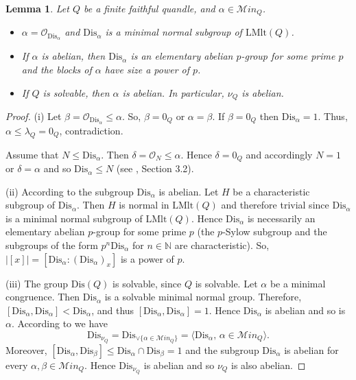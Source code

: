 \documentclass[a4paper, english, 9pt]{amsart}
\theoremstyle{plain}
\newtheorem{lemma}[theorem]{Lemma}
\theoremstyle{definition}
\def\lmlt{\mathrm{LMlt}}
\def\dis{\mathrm{Dis}}
\def\comment#1{{\color{red} #1}}
\def\ma{\mathcal Min}
\begin{document}
\begin{lemma}\label{minimal cong}
Let $Q$ be a finite faithful quandle, and $\alpha\in \ma_Q$. 
\begin{itemize}
    \item[(i)] $\alpha=\mathcal{O}_{\dis_\alpha}$ and $\dis_\alpha$ is a minimal normal subgroup of $\lmlt(Q)$.
    \item[(ii)] If $\alpha$ is abelian, then $\dis_\alpha$ is an elementary abelian $p$-group for some prime $p$ and the blocks of $\alpha$ have size a power of $p$.
\item[(iii)]  If $Q$ is solvable, then $\alpha$ is abelian. In particular, $\nu_Q$ is abelian.
\end{itemize}

\end{lemma}
\begin{proof}

(i) Let $\beta=\mathcal{O}_{\dis_\alpha}\leq \alpha$. So, $\beta=0_Q$ or $\alpha=\beta$. If $\beta=0_Q$ then $\dis_\alpha=1$. Thus, $\alpha\leq \lambda_Q=0_Q$, contradiction.

Assume that $N\leq \dis_\alpha$. Then $\delta=\mathcal{O}_N\leq \alpha$. Hence $\delta=0_Q$ and accordingly $N=1$ or $\delta=\alpha$ and so $\dis_\alpha\leq N$ (see \cite{CP}, Section 3.2). 

(ii) According to \cite[Corollary 5.4]{CP} the subgroup $\dis_\alpha$ is abelian. Let $H$ be a characteristic subgroup of $\dis_\alpha$. Then $H$ is normal in $\lmlt(Q)$ and therefore trivial since $\dis_\alpha$ is a minimal normal subgroup of $\lmlt(Q)$. Hence $\dis_\alpha$ is necessarily an elementary abelian $p$-group for some prime $p$ (the $p$-Sylow subgroup and the subgroups of the form $p^n\dis_\alpha$ for $n\in \mathbb{N}$ are characteristic). So, $|[x]|=[\dis_\alpha:(\dis_\alpha)_x]$ is a power of $p$.

(iii) The group $\dis(Q)$ is solvable, since $Q$ is solvable. Let $\alpha$ be a minimal congruence. Then $\dis_\alpha$ is a solvable minimal normal group. Therefore, $[\dis_\alpha,\dis_\alpha]<\dis_\alpha$, and thus $[\dis_\alpha,\dis_\alpha]=1$. Hence $\dis_\alpha$ is abelian and so is $\alpha$. According to \cite[Proposition 3.2(2)]{CP} we have 
$$\dis_{\nu_Q}=\dis_{\vee \{\alpha\in \ma_Q\}}=\langle\dis_\alpha,\,\alpha \in \ma_Q\rangle.$$
Moreover, $[\dis_\alpha,\dis_\beta]\leq \dis_\alpha\cap\dis_\beta=1$ and the subgroup $\dis_\alpha$ is abelian for every $\alpha,\beta\in\ma_Q$. Hence $\dis_{\nu_Q}$ is abelian and so $\nu_Q$ is also abelian. %
\end{proof}
\end{document}
